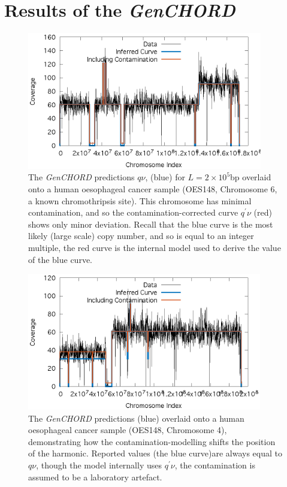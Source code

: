 \documentclass[fleqn,usenatbib]{acmart}
\def\codename{\textit{GenCHORD}}
\begin{document}
			\section{Results of the \codename{}}
			\begin{figure}
				\includegraphics[height=6cm]{Figures/human_chr6.eps}
				\caption{The \codename{} predictions $q\nu$, (blue) for $L=2\times 10^5$bp overlaid onto a human oesophageal cancer sample (OES148, Chromosome 6, a known chromothripsis site). This chromosome has minimal contamination, and so the contamination-corrected curve $q^\prime \nu$ (red) shows only minor deviation. Recall that the blue curve is the most likely (large scale) copy number, and so is equal to an integer multiple, the red curve is the internal model used to derive the value of the blue curve. }\label{F:Human6}
			\end{figure}
			\begin{figure}
				\includegraphics[height=6cm]{Figures/human_chr4.eps}
				\caption{The \codename{} predictions (blue) overlaid onto a human oesophageal cancer sample (OES148, Chromosome 4), demonstrating how the contamination-modelling shifts the position of the harmonic. Reported values (the blue curve)are always equal to $q \nu$, though the model internally uses $q^\prime \nu$, the contamination is assumed to be a laboratory artefact.}\label{F:Human4}
			\end{figure}
\end{document}
